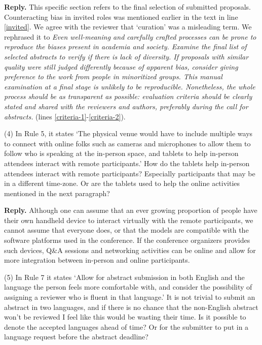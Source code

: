 \documentclass{article}
\newenvironment{Reply}{\noindent\color{BlueViolet}\textbf{Reply.}}{\vspace{1em}}
\begin{document}
\begin{Reply}
This specific section refers to the final selection of submitted proposals. Counteracting bias in invited roles was mentioned earlier in the text in line \ref{invited}.
We agree with the reviewer that `curation' was a misleading term.
We rephrased it to \textit{
Even well-meaning and carefully crafted processes can be prone to reproduce the biases present in academia and society. Examine the final list of selected abstracts to verify if there is lack of diversity. If proposals with similar quality were still judged differently because of apparent bias, consider giving preference to the work from people in minoritized groups.
This manual examination at a final stage is unlikely to be reproducible. Nonetheless, the whole process should be as transparent as possible: evaluation criteria should be clearly stated and shared with the reviewers and authors, preferably during the call for abstracts.} (lines \ref{criteria-1}-\ref{criteria-2}).

\end{Reply}

(4) In Rule 5, it states `The physical venue would have to include multiple ways to connect with online folks such as cameras and microphones to allow them to follow who is speaking at the in-person space, and tablets to help in-person attendees interact with remote participants.' How do the tablets help in-person attendees interact with remote participants? Especially participants that may be in a different time-zone. Or are the tablets used to help the online activities mentioned in the next paragraph?

\begin{Reply}
Although one can assume that an ever growing proportion of people have their own handheld device to interact virtually with the remote participants, we cannot assume that everyone does, or that the models are compatible with the software platforms used in the conference. 
If the conference organizers provides such devices, Q\&A sessions and networking activities can be online and allow for more integration between in-person and online participants. 
\end{Reply}

(5) In Rule 7 it states `Allow for abstract submission in both English and the language the person feels more comfortable with, and consider the possibility of assigning a reviewer who is fluent in that language.' It is not trivial to submit an abstract in two languages, and if there is no chance that the non-English abstract won't be reviewed I feel like this would be wasting their time. Is it possible to denote the accepted languages ahead of time? Or for the submitter to put in a language request before the abstract deadline?
\end{document}
